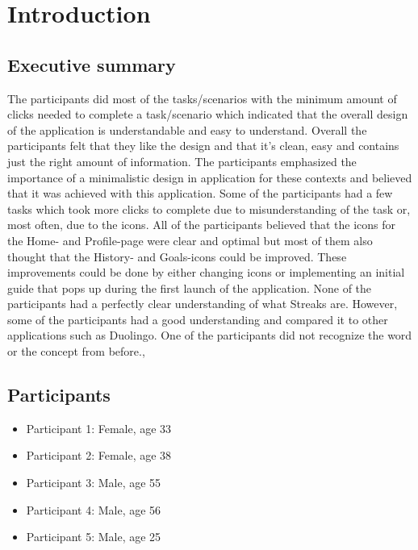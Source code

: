 \chapter{Introduction}

\section{Executive summary}
The participants did most of the tasks/scenarios with the minimum amount of clicks needed to complete a task/scenario which indicated that the overall design of the application is understandable and easy to understand. Overall the participants felt that they like the design and that it's clean, easy and contains just the right amount of information. The participants emphasized the importance of a minimalistic design in application for these contexts and believed that it was achieved with this application. Some of the participants had a few tasks which took more clicks to complete due to misunderstanding of the task or, most often, due to the icons. All of the participants believed that the icons for the Home- and Profile-page were clear and optimal but most of them also thought that the History- and Goals-icons could be improved. These improvements could be done by either changing icons or implementing an initial guide that pops up during the first launch of the application. None of the  participants had a perfectly clear understanding of what Streaks are. However, some of the participants had a good understanding and compared it to other applications such as Duolingo. One of the participants did not recognize the word or the concept from before.,

\section{Participants}
\begin{itemize}
    \item Participant 1: Female, age 33
    \item Participant 2: Female, age 38
    \item Participant 3: Male, age 55
    \item Participant 4: Male, age 56
    \item Participant 5: Male, age 25
\end{itemize}